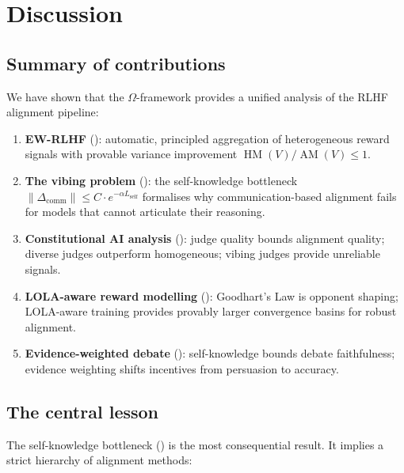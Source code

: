 \documentclass[11pt,a4paper]{article}
\DeclareMathOperator{\AM}{AM}
\DeclareMathOperator{\HM}{HM}
\begin{document}
\section{Discussion}
\label{sec:discussion}

\subsection{Summary of contributions}

We have shown that the $\Omega$-framework provides a unified analysis of the RLHF alignment pipeline:

\begin{enumerate}
    \item \textbf{EW-RLHF} (): automatic, principled aggregation of heterogeneous reward signals with provable variance improvement $\HM(V)/\AM(V) \leq 1$.

    \item \textbf{The vibing problem} (): the self-knowledge bottleneck $\|\Delta_{\mathrm{comm}}\| \leq C \cdot e^{-\alpha L_{\mathrm{self}}}$ formalises why communication-based alignment fails for models that cannot articulate their reasoning.

    \item \textbf{Constitutional AI analysis} (): judge quality bounds alignment quality; diverse judges outperform homogeneous; vibing judges provide unreliable signals.

    \item \textbf{LOLA-aware reward modelling} (): Goodhart's Law is opponent shaping; LOLA-aware training provides provably larger convergence basins for robust alignment.

    \item \textbf{Evidence-weighted debate} (): self-knowledge bounds debate faithfulness; evidence weighting shifts incentives from persuasion to accuracy.
\end{enumerate}

\subsection{The central lesson}

The self-knowledge bottleneck () is the most consequential result. It implies a strict hierarchy of alignment methods:
\end{document}
